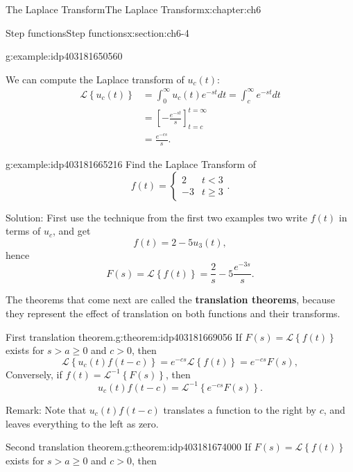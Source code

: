 \documentclass[oneside,10pt,]{book}
\newcommand{\terminology}[1]{\textbf{#1}}
\numberwithin{equation}{section}
\numberwithin{equation}{section}
\newcommand{\lt}{<}
\newcommand{\amp}{&}
\begin{document}
\begin{chapterptx}{The Laplace Transform}{}{The Laplace Transform}{}{}{x:chapter:ch6}
\begin{sectionptx}{Step functions}{}{Step functions}{}{}{x:section:ch6-4}
\begin{example}{}{g:example:idp403181650560}
%
\end{example}
We can compute the Laplace transform of \(u_{c}(t)\):%
\begin{align*}
\mathcal{L}\left\{ u_{c}(t)\right\}  \amp =\int_{0}^{\infty}u_{c}(t)e^{-st}dt=\int_{c}^{\infty}e^{-st}dt\\
\amp =\left[-\frac{e^{-st}}{s}\right]_{t=c}^{t=\infty}\\
\amp =\frac{e^{-cs}}{s}.
\end{align*}
%
\begin{example}{}{g:example:idp403181665216}%
Find the Laplace Transform of%
\begin{equation*}
f(t)=\begin{cases}
2 \amp t\lt3\\
-3 \amp t\geq3
\end{cases}.
\end{equation*}
%
\par
Solution: First use the technique from the first two examples two write \(f(t)\) in terms of \(u_{c}\), and get%
\begin{equation*}
f(t)=2-5u_{3}(t),
\end{equation*}
hence%
\begin{equation*}
F(s)=\mathcal{L}\left\{ f(t)\right\} =\frac{2}{s}-5\frac{e^{-3s}}{s}.
\end{equation*}
%
\end{example}
The theorems that come next are called the \terminology{translation theorems}, because they represent the effect of translation on both functions and their transforms.%
\begin{theorem}{First translation theorem.}{}{g:theorem:idp403181669056}%
If \(F(s)=\mathcal{L}\left\{ f(t)\right\} \) exists for \(s>a\geq0\) and \(c>0\), then%
\begin{equation*}
\mathcal{L}\left\{ u_{c}(t)f\left(t-c\right)\right\} =e^{-cs}\mathcal{L}\left\{ f(t)\right\} =e^{-cs}F(s),
\end{equation*}
Conversely, if \(f(t)=\mathcal{L}^{-1}\left\{ F(s)\right\} \), then%
\begin{equation*}
u_{c}(t)f\left(t-c\right) =\mathcal{L}^{-1}\left\{ e^{-cs}F(s)\right\} .
\end{equation*}
%
\end{theorem}
Remark: Note that \(u_{c}(t)f(t-c)\) translates a function to the right by \(c\), and leaves everything to the left as zero.%
\begin{theorem}{Second translation theorem.}{}{g:theorem:idp403181674000}%
If \(F(s)=\mathcal{L}\left\{ f(t)\right\} \) exists for \(s>a\geq0\) and \(c>0\), then%

\end{theorem}
\end{sectionptx}
\end{chapterptx}
\end{document}
